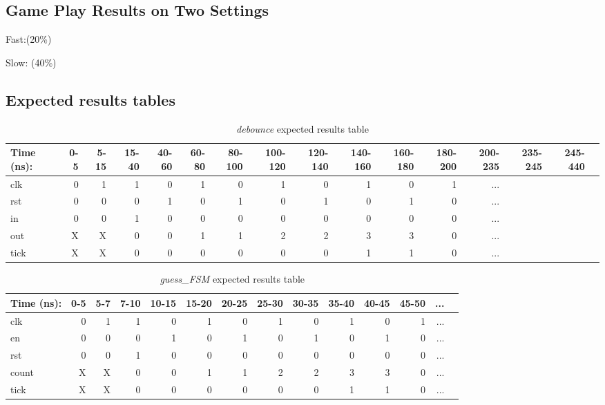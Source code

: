 \documentclass[11pt]{article}
\begin{document}
\subsection*{Game Play Results on Two Settings}
Fast:(20\%)

Slow: (40\%)

\subsection*{Expected results tables}

\begin{table}[ht]\centering
	\caption{\textit{debounce} expected results table}
	\label{ALU:tbl:alu_ERT}\medskip
	\begin{tabular}{l|rrrrrrrrrrrrrrr}
		Time (ns): & 0-5 & 5-15 & 15-40 & 40-60 & 60-80 & 80-100 & 100-120 & 120-140 & 140-160 & 160-180 & 180-200 & 200-235 & 235-245 & 245-440\\
		\midrule
		clk & 0  & 1 & 1 & 0 & 1 & 0 & 1 & 0 & 1 & 0 & 1 & ... \\
		rst & 0 & 0 & 0 & 1 & 0 & 1 & 0 & 1 & 0 & 1 & 0 & ...\\
		in & 0 & 0 & 1& 0 & 0 & 0 & 0 & 0 & 0 & 0 & 0 & ... \\
		\midrule
		out & X & X & 0 & 0  & 1 & 1 & 2 & 2 & 3 & 3 & 0 & ... \\
		tick & X & X & 0 & 0 & 0 & 0 & 0 & 0 & 1 & 1 & 0& ... \\
		\bottomrule
	\end{tabular}
\end{table}

\begin{table}[ht]\centering
	\caption{\textit{guess\_FSM} expected results table}
	\label{ALU:tbl:alu_ERT}\medskip
	\begin{tabular}{l|rrrrrrrrrrrrr}
		Time (ns): & 0-5 & 5-7 & 7-10 & 10-15 & 15-20 & 20-25 & 25-30 & 30-35 & 35-40 & 40-45 & 45-50 &...\\
		\midrule
		clk & 0  & 1 & 1 & 0 & 1 & 0 & 1 & 0 & 1 & 0 & 1 & ... \\
		en & 0 & 0 & 0 & 1 & 0 & 1 & 0 & 1 & 0 & 1 & 0 & ...\\
		rst & 0 & 0 & 1& 0 & 0 & 0 & 0 & 0 & 0 & 0 & 0 & ... \\
		\midrule
		count & X & X & 0 & 0  & 1 & 1 & 2 & 2 & 3 & 3 & 0 & ... \\
		tick & X & X & 0 & 0 & 0 & 0 & 0 & 0 & 1 & 1 & 0& ... \\
		\bottomrule
	\end{tabular}
\end{table}
\end{document}

